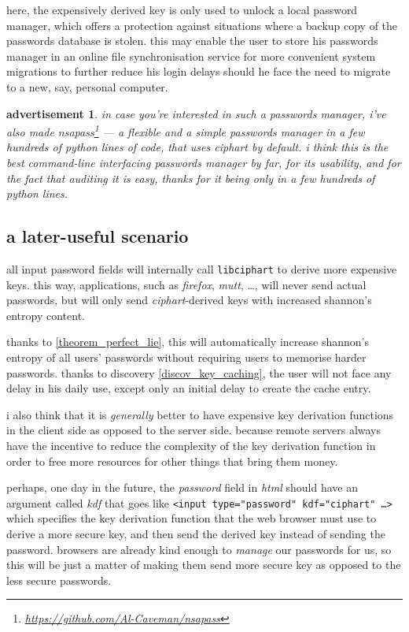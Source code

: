 \documentclass[twocolumn]{article}
\newtheorem{advertisement}{advertisement}
\begin{document}
here, the expensively derived key is only used to unlock a local password
manager, which offers a protection against situations where a backup copy
of the passwords database is stolen.  this may enable the user to store his
passwords manager in an online file synchronisation service for more
convenient system migrations to further reduce his login delays should he
face the need to migrate to a new, say, personal computer.

\begin{advertisement}
    in case you're interested in such a passwords manager, i've also made
    \emph{nsapass}\footnote{\url{https://github.com/Al-Caveman/nsapass}}
    --- a flexible and a simple passwords manager in a few hundreds of
    python lines of code, that uses \emph{ciphart} by default.  i think
    this is the best command-line interfacing passwords manager by far, for
    its usability, and for the fact that auditing it is easy, thanks for it
    being only in a few hundreds of python lines.
\end{advertisement}

\subsection{a later-useful scenario}
all input password fields will internally call \texttt{libciphart} to
derive more expensive keys.  this way, applications, such as
\emph{firefox}, \emph{mutt}, \ldots, will never send actual passwords, but
will only send \emph{ciphart}-derived keys with increased shannon's entropy
content.

thanks to \cref{theorem_perfect_lie}, this will automatically
increase shannon's entropy of all users' passwords without requiring users
to memorise harder passwords.  thanks to discovery
\ref{discov_key_caching}, the user will not face any delay in his daily
use, except only an initial delay to create the cache entry.

i also think that it is \emph{generally} better to have expensive key
derivation functions in the client side as opposed to the server side.
because remote servers always have the incentive to reduce the complexity
of the key derivation function in order to free more resources for other
things that bring them money.

perhaps, one day in the future, the \emph{password} field in \emph{html}
should have an argument called \emph{kdf} that goes like \texttt{<input
type="password" kdf="ciphart" \ldots>} which specifies the key derivation
function that the web browser must use to derive a more secure key, and
then send the derived key instead of sending the password.  browsers are
already kind enough to \emph{manage} our passwords for us, so this will be
just a matter of making them send more secure key as opposed to the less
secure passwords.  
\end{document}
